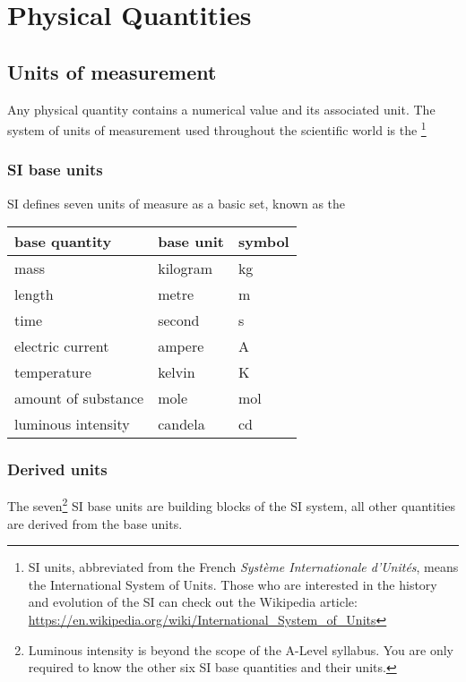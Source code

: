 \chapter{Physical Quantities}

\section{Units of measurement}

Any physical quantity contains a numerical value and its associated unit. The system of units of measurement used throughout the scientific world is the \footnote{SI units, abbreviated from the French \emph{Syst\`eme Internationale d'Unit\'es}, means the International System of Units. Those who are interested in the history and evolution of the SI can check out the Wikipedia article: \url{https://en.wikipedia.org/wiki/International_System_of_Units}}

\subsection{SI base units}

SI defines seven units of measure as a basic set, known as the 

\begin{center}
	\begin{tabular}{|C{5.4cm}|C{3cm}|C{3cm}|}
		\hline base quantity & base unit & symbol  \\ 
		\hline mass  & kilogram & kg \\ 
		\hline length & metre & m \\ 
		\hline time & second & s \\ 
		\hline electric current  & ampere & A \\ 
		\hline temperature & kelvin & K \\ 
		\hline amount of substance & mole & mol \\ 
		\hline luminous intensity & candela & cd \\ 
		\hline 
	\end{tabular} 
\end{center}


\subsection{Derived units}

The seven\footnote{Luminous intensity is beyond the scope of the A-Level syllabus. You are only required to know the other six SI base quantities and their units.} SI base units are building blocks of the SI system, all other quantities are derived from the base units.

